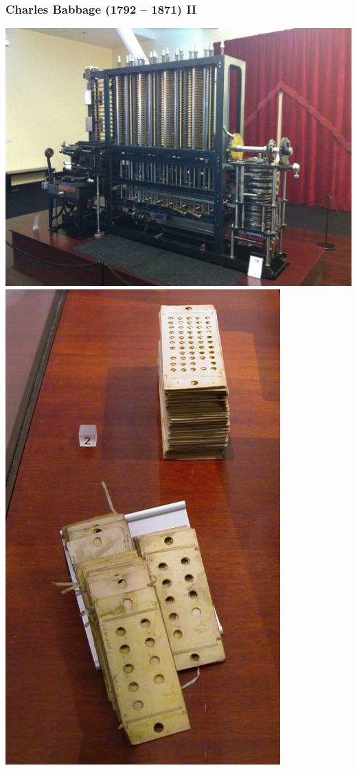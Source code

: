 \documentclass[utf8,10pt]{beamer}
\begin{document}
\begin{frame}
    \frametitle{Charles Babbage (1792 -- 1871) II}
        
        \begin{center}
        \includegraphics[scale=0.35]{./images/machine-babbage}
        \hfill
        \includegraphics[scale=0.9]{./images/PunchedCardsAnalyticalEngine}
    \end{center}
    
\end{frame}
\end{document}
